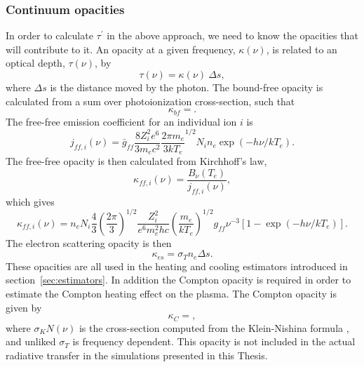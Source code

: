 \subsubsection{Continuum opacities}

In order to calculate $\tau^\prime$ in the above approach, we need
to know the opacities that will contribute to it. An opacity 
at a given frequency, $\kappa(\nu)$,
is related to an optical depth, $\tau(\nu)$, by
\begin{equation}
\tau(\nu) = \kappa(\nu)~\Delta s,
\end{equation}
where $\Delta s$ is the distance moved by the photon. The bound-free
opacity is calculated from a sum over photoionization cross-section,
such that
\begin{equation}
\kappa_{bf} = .
\end{equation}
The free-free emission coefficient for an individual ion $i$ is \citep{gayet1970}
\begin{equation}
j_{ff,i} (\nu) = \bar{g}_{ff}\frac{8Z_i^2e^6}{3m_e c^2}
\frac{2\pi m_e}{3 k T_e}^{1/2}
N_i n_e \exp(-h\nu/kT_e).
\label{eq:jff} 
\end{equation}
The free-free opacity is then calculated from Kirchhoff's law, 
\begin{equation}
\kappa_{ff, i}(\nu) = \frac{B_\nu (T_e)}{j_{ff,i} (\nu)},
\end{equation}
which gives
\begin{equation}
\kappa_{ff, i}(\nu) = n_e N_i \frac{4}{3} \left(\frac{2\pi}{3}\right)^{1/2} 
\frac{Z_i^2}{e^6 m_e^2 hc} \left(\frac{m_e}{kT_e}\right)^{1/2} 
g_{ff} \nu^{-3} [1 - \exp(-h\nu/kT_e)].
\end{equation}
The electron scattering opacity is then 
\begin{equation}
\kappa_{es} = \sigma_T n_e \Delta s.
\end{equation}
These opacities are all used in the heating and cooling estimators 
introduced in section~\ref{sec:estimators}. In addition the
Compton opacity is required in order to estimate the Compton heating effect on the plasma.
The Compton opacity is given by
\begin{equation}
\kappa_{C} = ,
\end{equation}
where $\sigma_KN (\nu)$ is the cross-section computed 
from the Klein-Nishina formula \citep{klein-nishina}, and unliked $\sigma_T$
is frequency dependent. This opacity is not included in the actual radiative transfer 
in the simulations presented in this Thesis.


